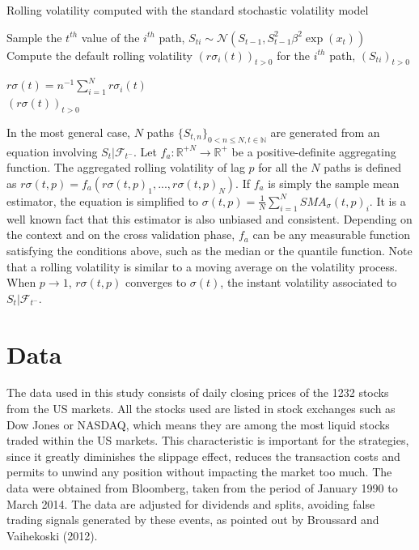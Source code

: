 \documentclass[11pt,a4,twosided,singlespacing,titlepagenumber=on]{scrreprt}
\numberwithin{equation}{chapter} %
\theoremstyle{remark}
\begin{document}
\begin{algorithm}
\caption{Rolling volatility computed with the standard stochastic volatility model}\label{volatility_std_sv}
\begin{algorithmic}[1]

		\State Sample the $t^{th}$ value of the $i^{th}$ path, $S_{ti} \sim \mathcal{N}(S_{t-1}, S_{t-1}^2 \beta^2 \exp(x_t))$
	\State Compute the default rolling volatility $(r\sigma_i(t))_{t>0}$ for the $i^{th}$ path, $(S_{ti})_{t>0}$

	\State $\displaystyle{r\sigma(t) = n^{-1} \sum_{i=1}^N r\sigma_i(t)}$
\\
\Return $(r\sigma(t))_{t>0}$
\EndProcedure
\end{algorithmic}
\end{algorithm}

\noindent
In the most general case, $N$ paths $\{S_{t,n}\}_{0 < n \leq N, t \in \mathbb{N}}$ are generated from an equation involving $S_t | \mathcal{F}_{t^-}$. Let $f_a : \mathbb{R}^{+N} \rightarrow \mathbb{R}^+$ be a positive-definite aggregating function. The aggregated rolling volatility of lag $p$ for all the $N$ paths is defined as $r\sigma(t,p) = f_a(r\sigma(t, p)_1,...,r\sigma(t, p)_N)$.
If $f_a$ is simply the sample mean estimator, the equation is simplified to
$\sigma(t,p) = \frac{1}{N}\sum_{i=1}^N SMA_\sigma(t, p)_i$. It is a well known fact that this estimator is also unbiased and consistent. Depending on the context and on the cross validation phase, $f_a$ can be any measurable function satisfying the conditions above, such as the median or the quantile function.
Note that a rolling volatility is similar to a moving average on the volatility process. When $p \rightarrow 1$, $r\sigma(t,p)$ converges to $\sigma(t)$, the instant volatility associated to $S_t | \mathcal{F}_{t^-}$.

\section{Data}
The data used in this study consists of daily closing prices of the 1232 stocks from the US markets. All the stocks used are listed in stock exchanges such as Dow Jones or NASDAQ, which means they are among the most liquid stocks traded within the US markets. This characteristic is important for the strategies, since it greatly diminishes the slippage effect, reduces the transaction costs and permits to unwind any position without impacting the market too much. The data were obtained from Bloomberg, taken from the period of January 1990 to March 2014. The data are adjusted for dividends and splits, avoiding false trading signals generated by these events, as pointed out by Broussard and Vaihekoski (2012).
\end{document}
